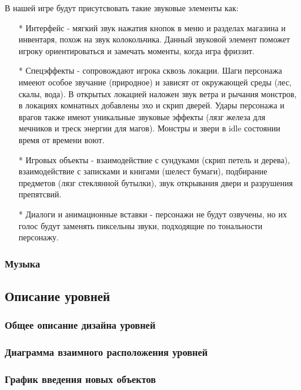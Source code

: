 \documentclass{article}
\begin{document}
В нашей игре будут присутсвовать такие звуковые элементы как:
\begin{itemize}
\item[*] Интерфейс - мягкий звук нажатия кнопок в меню и разделах магазина и инвентаря, похож на звук колокольчика. Данный звуковой элемент поможет игроку ориентироваться и замечать моменты, когда игра фриззит.
\item[*]  Спецэффекты - сопровождают игрока сквозь локации. Шаги персонажа имееют особое звучание (природное) и зависят от окружающей среды (лес, скалы, вода). В открытых локацией наложен звук ветра и рычания монстров, в локациях комнатных добавлены эхо и скрип дверей. Удары персонажа и врагов также имеют уникальные звуковые эффекты (лязг железа для мечников и треск энергии для магов). Монстры и звери в idle состоянии время от времени воют.
\item[*] Игровых объекты - взаимодействие с сундуками (скрип петель и дерева), взаимодействие с записками и книгами (шелест бумаги), подбирание предметов (лязг стеклянной бутылки), звук открывания двери и разрушения препятсвий.
\item[*] Диалоги и анимационные вставки - персонажи не будут озвучены, но их голос будут заменять пиксельны звуки, подходящие по тональности персонажу.
\end{itemize}

\subsubsection{Музыка}

\subsection{Описание уровней}

\subsubsection{Общее описание дизайна уровней}

\subsubsection{Диаграмма взаимного расположения уровней}

\subsubsection{График введения новых объектов}
\end{document}
